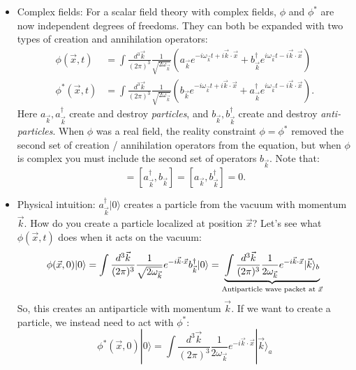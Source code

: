 \documentclass[12pt, oneside]{article}   	%
\theoremstyle{definition}
\begin{document}
\begin{itemize}

	\item Complex fields: For a scalar field theory with complex fields, $\phi$ and $\phi^*$ are now independent degrees of freedoms. They can both be expanded with two types of creation and annihilation operators:
	\begin{align}
		\phi(\vec x, t) &= \int \frac{d^3\vec k}{(2\pi)^3} \frac{1}{\sqrt{2\omega_{\vec k}}} (a_{\vec k} e^{-i\omega_{\vec k} t + i\vec k \cdot\vec x} + b_{\vec k}^\dagger e^{i\omega_{\vec k} t - i\vec k \cdot\vec x}) \\
		\phi^*(\vec x, t) &= \int \frac{d^3\vec k}{(2\pi)^3} \frac{1}{\sqrt{2\omega_{\vec k}}} (b_{\vec k} e^{-i\omega_{\vec k} t + i\vec k \cdot\vec x} + a_{\vec k}^\dagger e^{i\omega_{\vec k} t - i\vec k \cdot\vec x}).
	\end{align}
	Here $a_{\vec k}, a_{\vec k}^\dagger$ create and destroy \textit{particles}, and $b_{\vec k}, b_{\vec k}^\dagger$ create and destroy \textit{anti-particles}. When $\phi$ was a real field, the reality constraint $\phi = \phi^*$ removed the second set of creation / annihilation operators from the equation, but when $\phi$ is complex you must include the second set of operators $b_{\vec k}$. Note that:
	\begin{equation}
		[a_{\vec k}, b_{\vec k}] = [a_{\vec k}^\dagger, b_{\vec k}] = [a_{\vec k}, b_{\vec k}^\dagger] = 0.
	\end{equation}

	\item Physical intuition: $a_{\vec k}^\dagger |0\rangle$ creates a particle from the vacuum with momentum $\vec k$. How do you create a particle localized at position $\vec x$? Let's see what $\phi(\vec x, t)$ does when it acts on the vacuum:
	\begin{equation}
		\phi(\vec x, 0)|0\rangle = \int \frac{d^3\vec k}{(2\pi)^3} \frac{1}{\sqrt{2\omega_{\vec k}}} e^{-i\vec k\cdot\vec x} b_{\vec k}^\dagger |0\rangle = 
		\underbrace{\int \frac{d^3\vec k}{(2\pi)^3} \frac{1}{2\omega_{\vec k}} e^{-i\vec k\cdot\vec x} |\vec k\rangle_{b}}_{\textnormal{Antiparticle wave packet at $\vec x$}}
	\end{equation}
	So, this creates an antiparticle with momentum $\vec k$. If we want to create a particle, we instead need to act with $\phi^*$:
	\begin{equation}
		\phi^*(\vec x, 0) |0\rangle = \int \frac{d^3\vec k}{(2\pi)^3} \frac{1}{2\omega_{\vec k}} e^{-i\vec k\cdot\vec x} |\vec k\rangle_{a}
	\end{equation}

\end{itemize}
\end{document}
